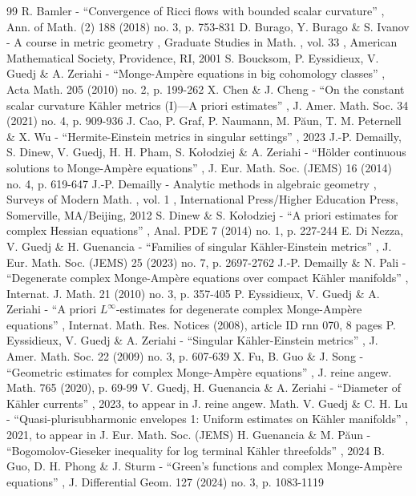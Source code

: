 \begin{thebibliography}{99}
 R. Bamler - “Convergence of Ricci flows with bounded scalar curvature” , Ann. of Math. (2) 188 (2018) no. 3, p. 753-831
 D. Burago, Y. Burago \& S. Ivanov - A course in metric geometry , Graduate Studies in Math. , vol. 33 , American Mathematical Society, Providence, RI, 2001
 S. Boucksom, P. Eyssidieux, V. Guedj \& A. Zeriahi - “Monge-Ampère equations in big cohomology classes” , Acta Math. 205 (2010) no. 2, p. 199-262
 X. Chen \& J. Cheng - “On the constant scalar curvature Kähler metrics (I)—A priori estimates” , J. Amer. Math. Soc. 34 (2021) no. 4, p. 909-936
 J. Cao, P. Graf, P. Naumann, M. Păun, T. M. Peternell \& X. Wu - “Hermite-Einstein metrics in singular settings” , 2023
 J.-P. Demailly, S. Dinew, V. Guedj, H. H. Pham, S. Kołodziej \& A. Zeriahi - “Hölder continuous solutions to Monge-Ampère equations” , J. Eur. Math. Soc. (JEMS) 16 (2014) no. 4, p. 619-647
 J.-P. Demailly - Analytic methods in algebraic geometry , Surveys of Modern Math. , vol. 1 , International Press/Higher Education Press, Somerville, MA/Beijing, 2012
 S. Dinew \& S. Kołodziej - “A priori estimates for complex Hessian equations” , Anal. PDE 7 (2014) no. 1, p. 227-244
 E. Di Nezza, V. Guedj \& H. Guenancia - “Families of singular Kähler-Einstein metrics” , J. Eur. Math. Soc. (JEMS) 25 (2023) no. 7, p. 2697-2762
 J.-P. Demailly \& N. Pali - “Degenerate complex Monge-Ampère equations over compact Kähler manifolds” , Internat. J. Math. 21 (2010) no. 3, p. 357-405
 P. Eyssidieux, V. Guedj \& A. Zeriahi - “A priori $L^\infty $-estimates for degenerate complex Monge-Ampère equations” , Internat. Math. Res. Notices (2008), article ID rnn 070, 8 pages
 P. Eyssidieux, V. Guedj \& A. Zeriahi - “Singular Kähler-Einstein metrics” , J. Amer. Math. Soc. 22 (2009) no. 3, p. 607-639
 X. Fu, B. Guo \& J. Song - “Geometric estimates for complex Monge-Ampère equations” , J. reine angew. Math. 765 (2020), p. 69-99
 V. Guedj, H. Guenancia \& A. Zeriahi - “Diameter of Kähler currents” , 2023, to appear in J. reine angew. Math.
 V. Guedj \& C. H. Lu - “Quasi-plurisubharmonic envelopes 1: Uniform estimates on Kähler manifolds” , 2021, to appear in J. Eur. Math. Soc. (JEMS)
 H. Guenancia \& M. Păun - “Bogomolov-Gieseker inequality for log terminal Kähler threefolds” , 2024
 B. Guo, D. H. Phong \& J. Sturm - “Green’s functions and complex Monge-Ampère equations” , J. Differential Geom. 127 (2024) no. 3, p. 1083-1119

\end{thebibliography}
